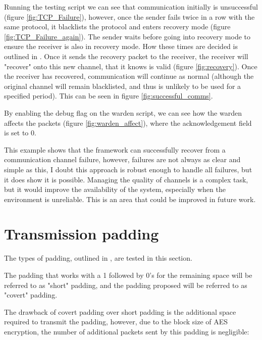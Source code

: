 Running the testing script we can see that communication initially is unsuccessful (figure \ref{fig:TCP_Failure}), however, once the sender fails twice in a row with the same protocol, it blacklists the protocol and enters recovery mode (figure \ref{fig:TCP_Failure_again}). The sender waits before going into recovery mode to ensure the receiver is also in recovery mode. How these times are decided is outlined in . Once it sends the recovery packet to the receiver, the receiver will "recover" onto this new channel, that it knows is valid (figure \ref{fig:recovery}). Once the receiver has recovered, communication will continue as normal (although the original channel will remain blacklisted, and thus is unlikely to be used for a specified period). This can be seen in figure \ref{fig:successful_comms}.

By enabling the debug flag on the warden script, we can see how the warden affects the packets (figure \ref{fig:warden_affect}), where the acknowledgement field is set to 0.

This example shows that the framework can successfully recover from a communication channel failure, however, failures are not always as clear and simple as this, I doubt this approach is robust enough to handle all failures, but it does show it is possible. Managing the quality of channels is a complex task, but it would improve the availability of the system, especially when the environment is unreliable. This is an area that could be improved in future work.

\section{Transmission padding}
\label{sec:padding_testing}

The types of padding, outlined in , are tested in this section.

The padding that works with a 1 followed by 0's for the remaining space will be referred to as "short" padding, and the padding proposed will be referred to as "covert" padding.

The drawback of covert padding over short padding is the additional space required to transmit the padding, however, due to the block size of AES encryption, the number of additional packets sent by this padding is negligible:

